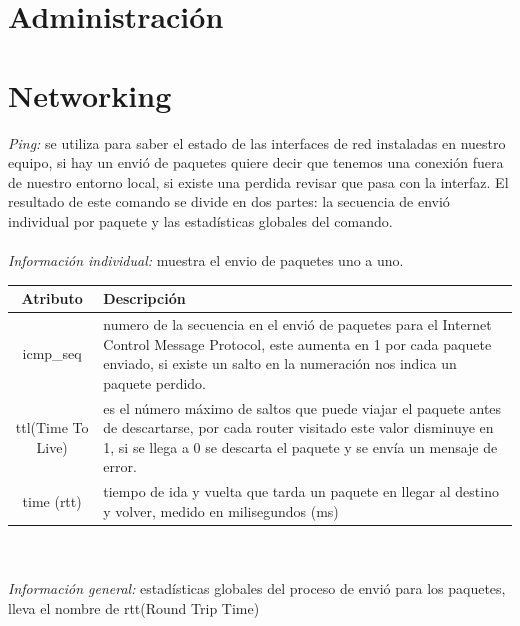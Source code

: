 \documentclass[10pt,a4paper,titlepage]{article}
\begin{document}
	\section*{Administración}
	
	\section*{Networking}
	\emph{Ping:} se utiliza para saber el estado de las interfaces de red instaladas en nuestro equipo, si hay un envió de paquetes quiere decir que tenemos una conexión fuera de nuestro entorno local, si existe una perdida revisar que pasa con la interfaz. El resultado de este comando se divide en dos partes: la secuencia de envió individual por paquete y las estadísticas globales del comando.
	\\
	\\
	\emph{Información individual:} muestra el envio de paquetes uno a uno.
	\\
	\begin{tabular}{|c|p{8cm}|}
		\hline
		Atributo & Descripción \\
		\hline
		icmp\_seq & numero de la secuencia en el envió de paquetes para el Internet Control Message Protocol, este aumenta en 1 por cada paquete enviado, si existe un salto en la numeración nos indica un paquete perdido. \\
		\hline
		ttl(Time To Live) & es el número máximo de saltos que puede viajar el paquete antes de descartarse, por cada router visitado este valor disminuye en 1, si se llega a 0 se descarta el paquete y se envía un mensaje de error. \\
		\hline
		time (rtt) & tiempo de ida y vuelta que tarda un paquete en llegar al destino y volver, medido en milisegundos (ms) \\
		\hline
	\end{tabular}
	\\
	\\
	\emph{Información general:} estadísticas globales del proceso de envió para los paquetes, lleva el nombre de rtt(Round Trip Time)
	\\
	\\
\end{document}

